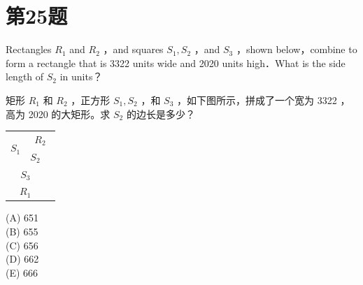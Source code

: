 \documentclass[10pt]{article}
\begin{document}
\section*{第25题}
Rectangles $R_{1}$ and $R_{2}$ ，and squares $S_{1}, S_{2}$ ，and $S_{3}$ ，shown below，combine to form a rectangle that is 3322 units wide and 2020 units high．What is the side length of $S_{2}$ in units？

矩形 $R_{1}$ 和 $R_{2}$ ，正方形 $S_{1}, S_{2}$ ，和 $S_{3}$ ，如下图所示，拼成了一个宽为 3322 ，高为 2020 的大矩形。求 $S_{2}$ 的边长是多少？

\begin{center}
\begin{tabular}{|c|c|c|}
\hline
\multirow{2}{*}{$S_{1}$} & \multicolumn{2}{|c|}{$R_{2}$} \\
\cline { 2 - 2 }
 & $S_{2}$ &  \\
\cline { 1 - 1 }
\multicolumn{2}{|c|}{$S_{3}$} &  \\
\hline
\multicolumn{2}{|c|}{$R_{1}$} &  \\
\hline
\end{tabular}
\end{center}

(A) 651\\
(B) 655\\
(C) 656\\
(D) 662\\
(E) 666
\end{document}
